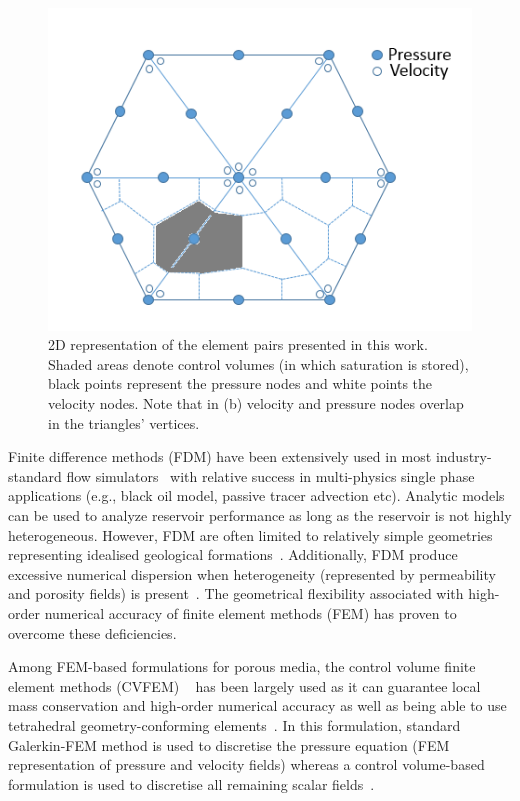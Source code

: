 \documentclass[preprint,authoryear,12pt]{elsarticle}
\begin{document}
\begin{figure}[h]
\centering
\includegraphics[width=.5\textwidth]{./Pics/P1DGP2.PNG}
\caption{2D representation of the element pairs presented in this work. Shaded areas denote control volumes (in which saturation is stored), black points represent the pressure nodes and white points the velocity nodes. Note that in (b) velocity and pressure nodes overlap in the triangles' vertices.}
\label{fig:fem_cv}
\end{figure}

Finite difference methods (FDM) have been extensively used in most industry-standard flow simulators~\citep{aziz_1986, chen_2005, chang_1990} with relative success in multi-physics single phase applications (e.g., black oil model, passive tracer advection etc). Analytic models can be used to analyze reservoir performance as long as the reservoir is not highly heterogeneous. However, FDM are often limited to relatively simple geometries 
representing idealised geological formations~\citep{mlacnik_2004, king_1999}. Additionally, FDM produce excessive numerical dispersion when heterogeneity (represented by permeability and porosity fields) is present~\citep{chavent_1986}. The geometrical flexibility associated with high-order numerical accuracy of finite element methods (FEM) has proven to overcome these deficiencies. 

Among FEM-based formulations for porous media, the control volume finite element methods (CVFEM) ~\citep[CVFEM,][]{fung_1992,cordazzo_2004} has been largely used as it can guarantee local mass conservation and high-order numerical accuracy as well as being able to use tetrahedral geometry-conforming elements~\citep{forsyth_1990, geiger_2004, hurtado_2007}. In this formulation, standard Galerkin-FEM method is used to discretise the pressure equation (FEM representation of pressure and velocity fields) whereas a control volume-based formulation is used to discretise all remaining scalar fields~\citep[e.g., saturation, density, species concentration etc, see][]{gomes_book_2012}. 
\end{document}

